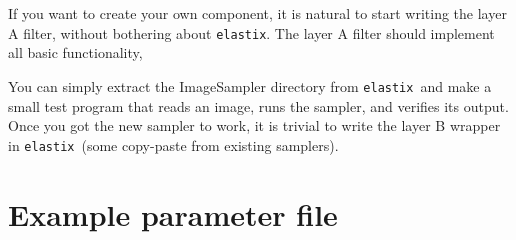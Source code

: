 \documentclass[]{report}
\newcommand{\elastix}{\texttt{elastix}}
\begin{document}
If you want to create your own component, it is natural to start
writing the layer A filter, without bothering about \elastix. The
layer A filter should implement all basic functionality,

You can simply extract the ImageSampler directory from \elastix\ and
make a small test program that reads an image, runs the sampler, and
verifies its output. Once you got the new sampler to work, it is
trivial to write the layer B wrapper in \elastix\ (some copy-paste
from existing samplers).



\appendix

\chapter{Example parameter file}\label{chp:ExampleParam}
\end{document}
